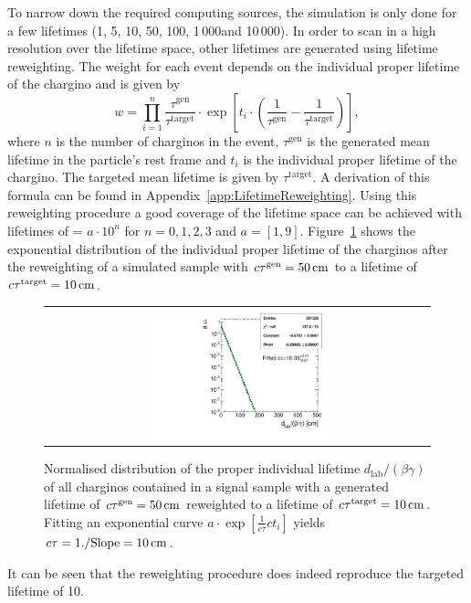 To narrow down the required computing sources, the simulation is only done for a few lifetimes (1\cm, 5\cm, 10\cm, 50\cm, 100\cm, 1\,000\cm and 10\,000\cm).
In order to scan in a high resolution over the lifetime space, other lifetimes are generated using lifetime reweighting.
The weight for each event depends on the individual proper lifetime of the chargino and is given by
\begin{equation*}
w = \prod_{i=1}^n \frac{\tau^{\text{gen}}}{\tau^{\text{target}}}\cdot  \exp \left[ t_i \cdot \left( \frac{1}{\tau^{\text{gen}}} - \frac{1}{\tau^{\text{target}}} \right) \right] ,
\end{equation*}
where $n$ is the  number of charginos in the event, $\tau^{\text{gen}}$ is the generated mean lifetime in the particle's rest frame and $t_i$ is the individual proper lifetime of the chargino. 
The targeted mean lifetime is given by $\tau^{\text{target}}$. 
A derivation of this formula can be found in Appendix~\ref{app:LifetimeReweighting}.
Using this reweighting procedure a good coverage of the lifetime space can be achieved with lifetimes of \ctau = $a\cdot10^{n}$ for $n=0,1,2,3$ and $a=\left[1,9\right]$.
Figure~\ref{fig:LifetimeReweighting} shows the exponential distribution of the individual proper lifetime of the charginos after the reweighting of a simulated sample with $c\tau^{\text{gen}}=50\,\text{cm}$ to a lifetime of $c\tau^{\text{target}}=10\,\text{cm}$.
\begin{figure}[!b]
  \centering 
  \begin{tabular}{c}
    \includegraphics[width=0.49\textwidth]{figures/analysis/10cm.pdf}
  \end{tabular}
  \caption{Normalised distribution of the proper individual lifetime $d_{\text{lab}}/\left(\beta\gamma \right)$ of all charginos contained in a signal sample with a generated lifetime of $c\tau^{\text{gen}}=50\,\text{cm}$ reweighted to a lifetime of $c\tau^{\text{target}}=10\,\text{cm}$. Fitting an exponential curve $a\cdot \exp\left[\frac{1}{c \tau } c t_i\right]$ yields $c\tau=1./\text{Slope}=10\,\text{cm}$.}
  \label{fig:LifetimeReweighting}
\end{figure}
It can be seen that the reweighting procedure does indeed reproduce the targeted lifetime of 10\cm.


